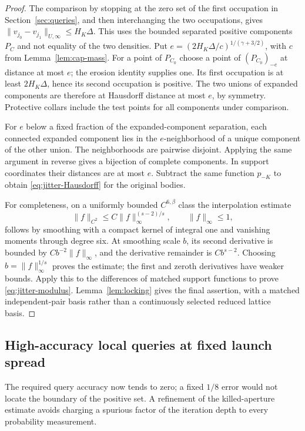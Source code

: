 \begin{proof}
The comparison by stopping at the zero set of the first occupation in
Section~\ref{sec:queries}, and then interchanging the two occupations,
gives
$\|v_{j_0}-v_{j_1}\|_{U,\infty}\le H_K\Delta$.
This uses the bounded separated positive components $P_C$ and not
equality of the two densities. Put
$e=(2H_K\Delta/c)^{1/(\gamma+3/2)}$, with $c$ from
Lemma~\ref{lem:cap-mass}. For a point of $P_{C_0}$ choose a point of
$(P_{C_0})_{-e}$ at distance at most $e$; the erosion identity supplies
one. Its first occupation is at least $2H_K\Delta$, hence its second
occupation is positive. The two unions of expanded components are
therefore at Hausdorff distance at most $e$, by symmetry. Protective
collars include the test points for all components under comparison.

For $e$ below a fixed fraction of the expanded-component separation,
each connected expanded component lies in the $e$-neighborhood of a
unique component of the other union. The neighborhoods are pairwise
disjoint. Applying the same argument in reverse gives a bijection of
complete components. In support coordinates their distances are at
most $e$. Subtract the same function $p_{-K}$ to obtain
\eqref{eq:jitter-Hausdorff} for the original bodies.

For completeness, on a uniformly bounded $C^{6,\beta}$ class the
interpolation estimate
\[
 \|f\|_{C^2}\le C\|f\|_\infty^{(s-2)/s},\qquad
                              \|f\|_\infty\le1,
\]
follows by smoothing with a compact kernel of integral one and vanishing
moments through degree six. At smoothing scale $b$, its second
derivative is bounded by $C b^{-2}\|f\|_\infty$, and the derivative
remainder is $C b^{s-2}$. Choosing $b=\|f\|_\infty^{1/s}$ proves
the estimate; the first and zeroth derivatives have weaker bounds.
Apply this to the differences of matched support functions to prove
\eqref{eq:jitter-modulus}. Lemma~\ref{lem:locking} gives the final
assertion, with a matched independent-pair basis rather than a
continuously selected reduced lattice basis.
\end{proof}

\subsection{High-accuracy local queries at fixed launch spread}
The required query accuracy now tends to zero; a fixed $1/8$ error
would not locate the boundary of the positive set. A refinement of the
killed-aperture estimate avoids charging a spurious factor of the
iteration depth to every probability measurement.

